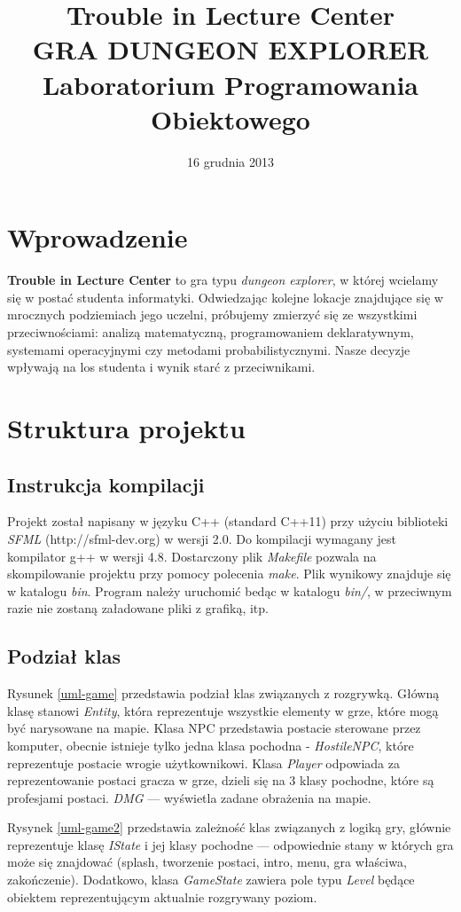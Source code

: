\documentclass[10pt,a4paper]{article}
\author{\authorthing}
\date{16 grudnia 2013}
\title{Trouble in Lecture Center\\\small{\MakeUppercase{Gra dungeon explorer}}\\\Large{Laboratorium Programowania Obiektowego}}
\begin{document}
\maketitle


\section{Wprowadzenie}
\textbf{Trouble in Lecture Center} to gra typu \textit{dungeon explorer}, w której wcielamy się w postać studenta informatyki. Odwiedzając kolejne lokacje znajdujące się w mrocznych podziemiach jego uczelni, próbujemy zmierzyć się ze wszystkimi przeciwnościami: analizą matematyczną, programowaniem deklaratywnym, systemami operacyjnymi czy metodami probabilistycznymi. Nasze decyzje wpływają na los studenta i wynik starć z przeciwnikami.


\section{Struktura projektu}
\subsection{Instrukcja kompilacji}
Projekt został napisany w języku C++ (standard C++11) przy użyciu biblioteki \textit{SFML} (http://sfml-dev.org) w wersji 2.0. Do kompilacji wymagany jest kompilator g++ w wersji 4.8. Dostarczony plik \textit{Makefile} pozwala na skompilowanie projektu przy pomocy polecenia \textit{make}. Plik wynikowy znajduje się w katalogu \textit{bin}. Program należy uruchomić bedąc w katalogu \textit{bin/}, w przeciwnym razie nie zostaną załadowane pliki z grafiką, itp.

\subsection{Podział klas}
Rysunek \ref{uml-game} przedstawia podział klas związanych z rozgrywką. Główną klasę stanowi \textit{Entity}, która reprezentuje wszystkie elementy w grze, które mogą być narysowane na mapie. Klasa NPC przedstawia postacie sterowane przez komputer, obecnie istnieje tylko jedna klasa pochodna - \textit{HostileNPC}, które reprezentuje postacie wrogie użytkownikowi. Klasa \textit{Player} odpowiada za reprezentowanie postaci gracza w grze, dzieli się na 3 klasy pochodne, które są profesjami postaci. \textit{DMG} --- wyświetla zadane obrażenia na mapie.

Rysynek \ref{uml-game2} przedstawia zależność klas związanych z logiką gry, głównie reprezentuje klasę \textit{IState} i jej klasy pochodne --- odpowiednie stany w których gra może się znajdować (splash, tworzenie postaci, intro, menu, gra właściwa, zakończenie). Dodatkowo, klasa \textit{GameState} zawiera pole typu \textit{Level} będące obiektem reprezentującym aktualnie rozgrywany poziom.
\end{document}
